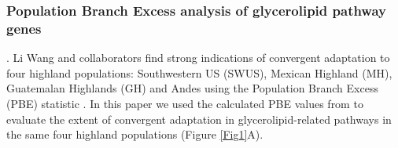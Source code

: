 \documentclass[9pt,twocolumn,twoside,lineno]{BioRxiv}
\begin{document}
\subsubsection{Population Branch Excess analysis of glycerolipid pathway genes}. 
Li Wang and collaborators \cite{Wang2020-mp} find strong indications of convergent adaptation to four highland populations: Southwestern US (SWUS), Mexican Highland (MH), Guatemalan Highlands (GH) and Andes using the Population Branch Excess (PBE) statistic \cite{Pool2017-oa}.
In this paper we used the calculated PBE values from \cite{Wang2020-mp} to evaluate the extent of convergent adaptation in glycerolipid-related pathways in the same four highland populations (Figure \ref{Fig1}A). 
\end{document}
